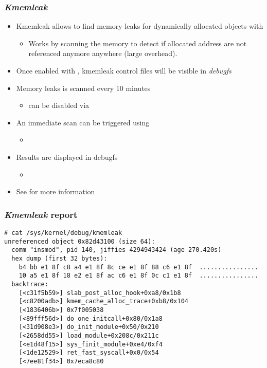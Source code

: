 \begin{frame}
  \frametitle{{\em Kmemleak}}
  \begin{itemize}
    \item Kmemleak allows to find memory leaks for dynamically allocated objects
          with 
    \begin{itemize}
      \item Works by scanning the memory to detect if allocated address are not
            referenced anymore anywhere (large overhead).
    \end{itemize}
    \item Once enabled with , kmemleak control
          files will be visible in {\em debugfs}
    \item Memory leaks is scanned every 10 minutes
    \begin{itemize}
      \item can be disabled via 
    \end{itemize}
    \item An immediate scan can be triggered using 
    \begin{itemize}
      \item {}
    \end{itemize}
    \item Results are displayed in debugfs
    \begin{itemize}
      \item {}
    \end{itemize}
    \item See  for more information
  \end{itemize}
\end{frame}

\begin{frame}[fragile]
  \frametitle{{\em Kmemleak} report}
  \begin{block}{}
    \begin{verbatim}
# cat /sys/kernel/debug/kmemleak
unreferenced object 0x82d43100 (size 64):
  comm "insmod", pid 140, jiffies 4294943424 (age 270.420s)
  hex dump (first 32 bytes):
    b4 bb e1 8f c8 a4 e1 8f 8c ce e1 8f 88 c6 e1 8f  ................
    10 a5 e1 8f 18 e2 e1 8f ac c6 e1 8f 0c c1 e1 8f  ................
  backtrace:
    [<c31f5b59>] slab_post_alloc_hook+0xa8/0x1b8
    [<c8200adb>] kmem_cache_alloc_trace+0xb8/0x104
    [<1836406b>] 0x7f005038
    [<89fff56d>] do_one_initcall+0x80/0x1a8
    [<31d908e3>] do_init_module+0x50/0x210
    [<2658dd55>] load_module+0x208c/0x211c
    [<e1d48f15>] sys_finit_module+0xe4/0xf4
    [<1de12529>] ret_fast_syscall+0x0/0x54
    [<7ee81f34>] 0x7eca8c80
    \end{verbatim}
  \end{block}
\end{frame}

